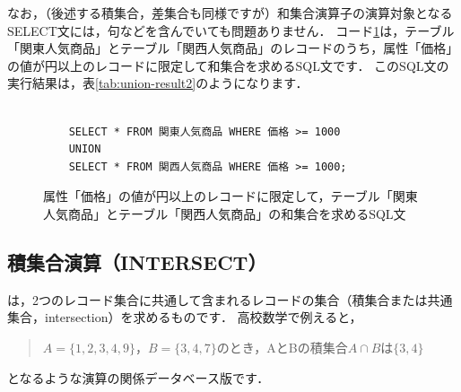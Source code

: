 なお，（後述する積集合，差集合も同様ですが）和集合演算子の演算対象となるSELECT文には，句などを含んでいても問題ありません．
コード\ref{code:sql-union2}は，テーブル「関東人気商品」とテーブル「関西人気商品」のレコードのうち，属性「価格」の値が円以上のレコードに限定して和集合を求めるSQL文です．
このSQL文の実行結果は，表\ref{tab:union-result2}のようになります．
\begin{figure}[!htbp]
    \begin{verbatim}

    SELECT * FROM 関東人気商品 WHERE 価格 >= 1000
    UNION
    SELECT * FROM 関西人気商品 WHERE 価格 >= 1000;

    \end{verbatim}
    \captionsetup{name=コード}
    \caption{属性「価格」の値が円以上のレコードに限定して，テーブル「関東人気商品」とテーブル「関西人気商品」の和集合を求めるSQL文}
    \label{code:sql-union2}
\end{figure}
\begin{table}[!htbp]
    \centering
    \caption{属性「価格」の値が円以上のレコードに限定して，テーブル「関東人気商品」とテーブル「関西人気商品」同士の和集合を求めるSQL文の実行結果}
    \label{tab:union-result2}
\end{table}


\subsection{積集合演算（INTERSECT）}
は，2つのレコード集合に共通して含まれるレコードの集合（積集合または共通集合，intersection）を求めるものです．
高校数学で例えると，
\begin{quotation}
$A=\{1, 2, 3, 4, 9\}$，$B=\{3, 4, 7\}$のとき，AとBの積集合$A \cap B$は$\{3, 4\}$
\end{quotation}
となるような演算の関係データベース版です．

